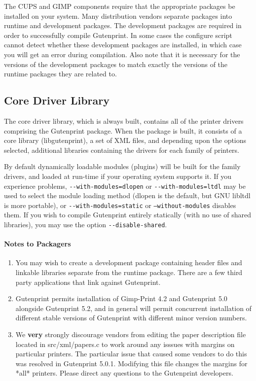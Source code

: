 \documentclass{article}[letter]
\def\code#1{\texttt{#1}}
\begin{document}
The CUPS and GIMP components require that the appropriate packages be
installed on your system. Many distribution vendors separate packages
into runtime and development packages. The development packages are
required in order to successfully compile Gutenprint. In some cases the
configure script cannot detect whether these development packages are
installed, in which case you will get an error during compilation. Also
note that it is necessary for the versions of the development packages
to match exactly the versions of the runtime packages they are related
to.

\subsection{Core Driver Library}

The core driver library, which is always built, contains all of the
printer drivers comprising the Gutenprint package. When the package is
built, it consists of a core library (libgutenprint), a set of XML
files, and depending upon the options selected, additional libraries
containing the drivers for each family of printers.

By default dynamically loadable modules (plugins) will be built for the
family drivers, and loaded at run-time if your operating system supports
it. If you experience problems, \code{‑‑with‑modules=dlopen} or
\code{‑‑with-modules=ltdl} may be used to select the module loading method
(dlopen is the default, but GNU libltdl is more portable), or
\code{‑‑with‑modules=static} or \code{--without-modules} disables them. If you
wish to compile Gutenprint entirely statically (with no use of shared
libraries), you may use the option \code{‑‑disable‑shared}.

\paragraph {Notes to Packagers}

\begin{enumerate}
\item You may wish to create a development package containing header files
    and linkable libraries separate from the runtime package. There are
    a few third party applications that link against Gutenprint.
    
\item Gutenprint permits installation of Gimp-Print 4.2 and Gutenprint 5.0
    alongside Gutenprint 5.2, and in general will permit concurrent
    installation of different stable versions of Gutenprint with
    different minor version numbers.
    
\item We {\bf very} strongly discourage vendors from editing the paper
    description file located in src/xml/papers.c to work around any
    isssues with margins on particular printers. The particular issue
    that caused some vendors to do this was resolved in Gutenprint
    5.0.1. Modifying this file changes the margins for *all* printers.
    Please direct any questions to the Gutenprint developers.
\end{enumerate}
\end{document}
